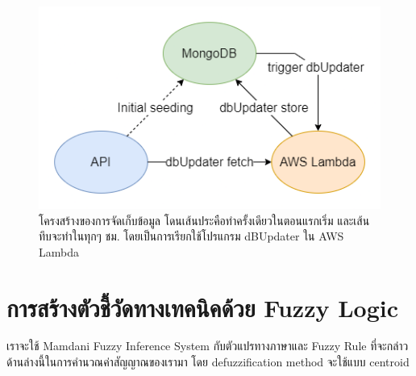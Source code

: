 \begin{figure}[ht]
    \centering
    \includegraphics[scale=0.6]{images/db.png}
    \caption{โครงสร้างของการจัดเก็บข้อมูล โดนเส้นประคือทำครั้งเดียวในตอนแรกเริ่ม และเส้นทึบจะทำในทุกๆ ชม. โดยเป็นการเรียกใช้โปรแกรม dBUpdater ใน AWS Lambda}
    \label{fig:7}
\end{figure}
\FloatBarrier

\section{การสร้างตัวชี้วัดทางเทคนิคด้วย Fuzzy Logic}
เราจะใช้ Mamdani Fuzzy Inference System กับตัวแปรทางภาษาและ Fuzzy Rule ที่จะกล่าวด้านล่างนี้ในการคำนวณค่าสัญญาณของเรามา โดย defuzzification method จะใช้แบบ
centroid 


